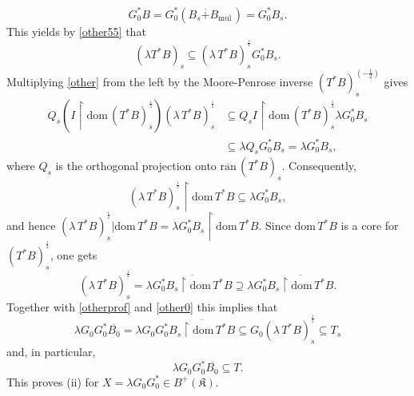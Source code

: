 \documentclass{amsart}
\makeatletter
\newcommand{\kk}{\mathfrak{K}}
\newcommand{\mul}{\mathrm{mul} \, }
\newcommand{\ranbar}{\overline{\mathrm{ran}}\,}
\newcommand{\D}{\mathrm{dom}\,}
\newcommand{\adj}{^*}
\newcommand{\ts}{T_s}
\newcommand{\tstar}{T^{*}}
\newcommand{\half}{^{\frac{1}{2}}}
\newcommand{\halfltsbs}{ (\lambda \,  \tstar B)^{\half}_s }
\newcommand{\halftsbs}{ ( \tstar B)^{\half}_s }
\newcommand{\inclu}{\subseteq}
\newcommand{\lplusk}{B^{+}(\kk)}
\newcommand{\rest}{\upharpoonright}
\numberwithin{equation}{section}
\renewenvironment{proof}[1][\proofname]{%
   \par\pushQED{\qed}\normalfont%
   \topsep6\p@\@plus6\p@\relax
   \trivlist\item[\hskip\labelsep\bfseries#1\@addpunct{.}]%
   \ignorespaces
}{%
   \popQED\endtrivlist\@endpefalse
}
\makeatother
\begin{document}
\begin{proof}
       \begin{equation} \label{other0}
         G_0\adj B   = G_0\adj  (B_s  \overset{.}{+} B_{\mul})
                          =    G_0\adj  B_s.
        \end{equation}
            This yields by \eqref{other55} that
                 \begin{equation} \label{other}
                  (\lambda  \tstar B)_s \inclu    \halfltsbs G_0\adj B_s.
                   \end{equation}
        Multiplying \eqref{other} from the left by the Moore-Penrose inverse $  (\tstar B)_s^{(-\frac{1}{2})}$  gives
                 \begin{align*}
                           Q_s (I \rest \D \halftsbs)   \halfltsbs & \inclu   Q_s I \rest \D \halftsbs   \lambda  G_0\adj B_s\\
                                                           & \inclu  \lambda Q_s    G_0\adj B_s = \lambda G_0\adj B_s,
                \end{align*}
               where $Q_s$ is the orthogonal  projection onto $\ranbar (\tstar B)_s.$
               Consequently,
              \begin{equation*}
                \halfltsbs \rest \D \tstar B \inclu \lambda   G_0\adj B_s,
              \end{equation*}
              and hence
              $
                  \halfltsbs| \D \tstar B  = \lambda  G_0\adj B_s \rest \D \tstar B.
              $
             Since $\D \tstar B $ is a core for $ \halftsbs$,   one gets
               \begin{equation*}
               \halfltsbs =   \lambda \overline{G_0\adj B_s \rest \D \tstar B} \supseteq \lambda  G_0\adj \overline{ B_s \rest \D \tstar B}.
              \end{equation*}
              Together with \eqref{otherprof} and \eqref{other0}  this implies that
             \begin{equation}\label{ghayth}
              \lambda G_0 G_0\adj \overline{B_0}= \lambda  G_0 G_0\adj \overline{ B_s \rest \D \tstar B} \inclu  G_0  \halfltsbs \inclu \ts
               \end{equation}
            and, in particular,
              $$
                \lambda G_0 G_0\adj \overline{ B_0} \inclu  T.
                $$
         This proves (ii) for $X=  \lambda  G_0 G_0\adj \in \lplusk.$


\end{proof}
\end{document}
